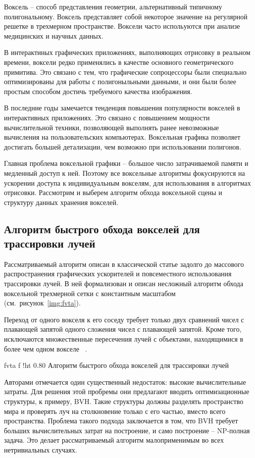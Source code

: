 Воксель -- способ представления геометрии, альтернативный типичному
полигональному. Воксель представляет собой некоторое значение на регулярной решетке в 
трехмерном пространстве. Воксели часто испольуются при анализе медицинских и научных
данных.

В интерактиных графических приложениях, выполняющих отрисовку в реальном времени, воксели 
редко применялись в качестве основного геометрического примитива. Это связано с тем, что
графические сопроцессоры были специально оптимизированы для работы с полигоныльными данными,
и они были более простым способом достичь требуемого качества изображения. 

В последние годы замечается тенденция повышения популярности вокселей в интерактивных приложениях.
Это связано с повышением мощности вычислительной техники, позволяющей выполнять ранее невозможные
вычисления на пользовательских компьютерах. Воксельная графика позволяет достигать большей детализации,
чем возможно при использовании полигонов. 

Главная проблема воксельной графики -- большое число затрачиваемой памяти и медленный доступ к ней.
Поэтому все воксельные алгоритмы фокусируются на ускорении доступа к индивидуальным вокселям, для
использования в алгоритмах отрисовки. Рассмотрим и выберем алгоритм обхода воксельной сцены и 
структуру данных хранения вокселей.

\subsection{Алгоритм быстрого обхода вокселей для трассировки лучей}
Рассматриваемый алгоритм описан в классической статье задолго до массового распространения 
графических ускорителей и повсеместного использования трассировки лучей. В ней формализован и описан несложный алгоритм обхода воксельной трехмерной сетки с константным масштабом (см.~рисунок~\ref{img:fvta}).

Переход от одного вокселя к его соседу требует только двух сравнений чисел с плавающей запятой  
одного сложения чисел с плавающей запятой. Кроме того, исключаются множественные пересечения лучей с объектами, находящимися в более чем одном вокселе
~\cite{AFVTAfRT}.

    {fvta}
    {f}
    {!ht}
    {0.80\textwidth}
    {Алгоритм быстрого обхода вокселей для трассировки лучей}

Авторами отмечается один существенный недостаток: высокие вычислительные затраты. Для решения
этой пробремы они предлагают вводить оптимизационные структуры, к примеру, BVH. Такие структуры должны разделять пространство мира
и проверять луч на столкновение только с его частью, вместо всего пространства. Проблема такого 
подхода заключается в том, что BVH требует больших вычислительных затрат на построение, и
само построение -- NP-полная задача. Это делает рассматриваемый алгоритм малоприменимым во 
всех нетривиальных случаях.

